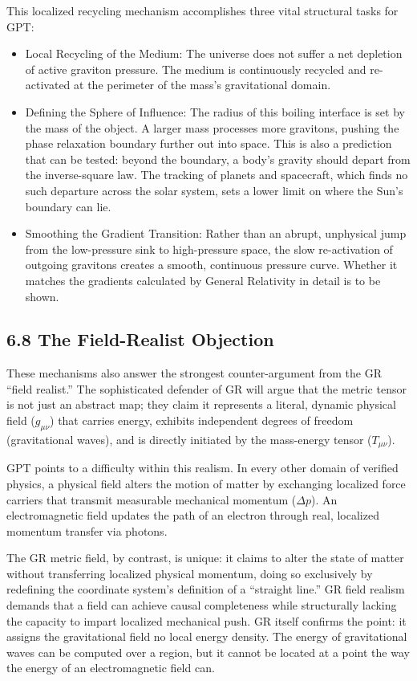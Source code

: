 \documentclass[11pt]{article}
\providecommand{\tightlist}{\setlength{\itemsep}{0pt}\setlength{\parskip}{0pt}}
\begin{document}
This localized recycling mechanism accomplishes three vital structural tasks for GPT:

\begin{itemize}
\tightlist
\item
  Local Recycling of the Medium: The universe does not suffer a net depletion of active graviton pressure. The medium is continuously recycled and re-activated at the perimeter of the mass's gravitational domain.
\item
  Defining the Sphere of Influence: The radius of this boiling interface is set by the mass of the object. A larger mass processes more gravitons, pushing the phase relaxation boundary further out into space. This is also a prediction that can be tested: beyond the boundary, a body's gravity should depart from the inverse-square law. The tracking of planets and spacecraft, which finds no such departure across the solar system, sets a lower limit on where the Sun's boundary can lie.
\item
  Smoothing the Gradient Transition: Rather than an abrupt, unphysical jump from the low-pressure sink to high-pressure space, the slow re-activation of outgoing gravitons creates a smooth, continuous pressure curve. Whether it matches the gradients calculated by General Relativity in detail is to be shown.
\end{itemize}

\subsection{6.8 The Field-Realist Objection}

These mechanisms also answer the strongest counter-argument from the GR ``field realist.'' The sophisticated defender of GR will argue that the metric tensor is not just an abstract map; they claim it represents a literal, dynamic physical field (\(g_{\mu\nu}\)) that carries energy, exhibits independent degrees of freedom (gravitational waves), and is directly initiated by the mass-energy tensor (\(T_{\mu\nu}\)).

GPT points to a difficulty within this realism. In every other domain of verified physics, a physical field alters the motion of matter by exchanging localized force carriers that transmit measurable mechanical momentum (\(\Delta p\)). An electromagnetic field updates the path of an electron through real, localized momentum transfer via photons.

The GR metric field, by contrast, is unique: it claims to alter the state of matter without transferring localized physical momentum, doing so exclusively by redefining the coordinate system's definition of a ``straight line.'' GR field realism demands that a field can achieve causal completeness while structurally lacking the capacity to impart localized mechanical push. GR itself confirms the point: it assigns the gravitational field no local energy density. The energy of gravitational waves can be computed over a region, but it cannot be located at a point the way the energy of an electromagnetic field can.
\end{document}
